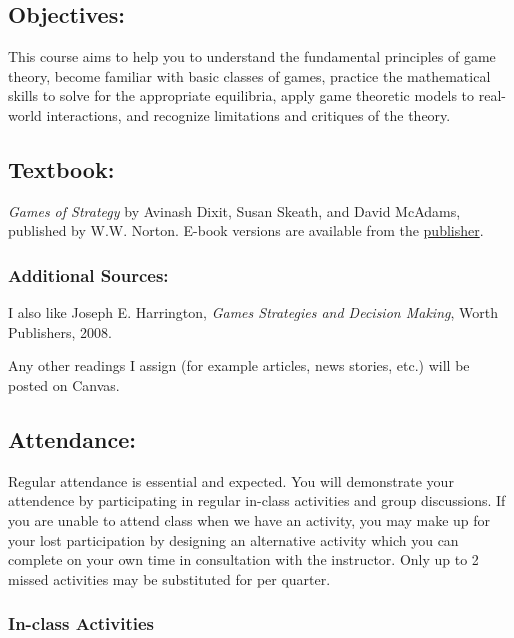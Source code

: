 \subsection*{Objectives:}

This course aims to help you to understand the fundamental principles of game theory, become familiar with basic classes of games, practice the mathematical skills to solve for the appropriate equilibria, apply game theoretic models to real-world interactions, and recognize limitations and critiques of the theory.

\subsection*{Textbook:}

  \textit{Games of Strategy} by Avinash Dixit, Susan Skeath, and David McAdams, published by W.W. Norton.
  E-book versions are available from the \href{https://wwnorton.com/books/Games-of-Strategy}{publisher}.
  
\subsubsection*{Additional Sources:}

  I also like Joseph E. Harrington, \textit{Games Strategies and Decision Making}, Worth Publishers, 2008.

 \noindent Any other readings I assign (for example articles, news stories, etc.) will be posted on Canvas.

\hypertarget{attendance policy}{\subsection*{Attendance:}}

  Regular attendance is essential and expected.
  You will demonstrate your attendence by participating in regular in-class activities and group discussions.
  If you are unable to attend class when we have an activity, you may make up for your lost participation by designing an alternative activity which you can complete on your own time in consultation with the instructor.
  Only up to 2 missed activities may be substituted for per quarter.

\hypertarget{grading_activity}{\subsubsection{In-class Activities}}

